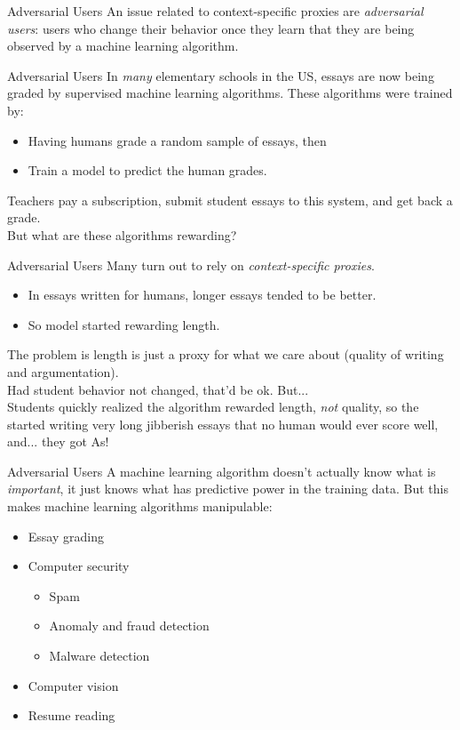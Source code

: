 \documentclass[11pt,handout]{beamer}
\begin{document}
\begin{frame}[c]{Adversarial Users}
  An issue related to context-specific proxies are \emph{adversarial users}: users who change their behavior once they learn that they are being observed by a machine learning algorithm.
\end{frame}

\begin{frame}[c]{Adversarial Users}
In \emph{many} elementary schools in the US, essays are now being graded by supervised machine learning algorithms.
These algorithms were trained by:
\begin{itemize}
  \item Having humans grade a random sample of essays, then
  \item Train a model to predict the human grades.
\end{itemize}
\pause Teachers pay a subscription, submit student essays to this system, and get back a grade. \\
\pause But what are these algorithms rewarding?
\end{frame}

\begin{frame}[c]{Adversarial Users}
  Many turn out to rely on \emph{context-specific proxies}.
  \begin{itemize}
    \item In essays written for humans, longer essays tended to be better.
    \item So model started rewarding length.
  \end{itemize}
  \pause The problem is length is just a \alert{proxy} for what we care about (quality of writing and argumentation).\\
  \pause Had student behavior not changed, that'd be ok. But... \\
  \vspace{0.1cm}
  Students quickly realized the algorithm rewarded length, \emph{not} quality, so the started writing very long jibberish essays that no human would ever score well, and... they got As!
\end{frame}

\begin{frame}[c]{Adversarial Users}
A machine learning algorithm doesn't actually know what is \emph{important}, it just knows what has predictive power in the training data. But this makes machine learning algorithms manipulable:
\begin{itemize}
  \item Essay grading
  \item Computer security \\
  \begin{itemize}
    \item Spam
    \item Anomaly and fraud detection
    \item Malware detection
  \end{itemize}
  \item Computer vision
  \item Resume reading
\end{itemize}
\end{frame}
\end{document}
